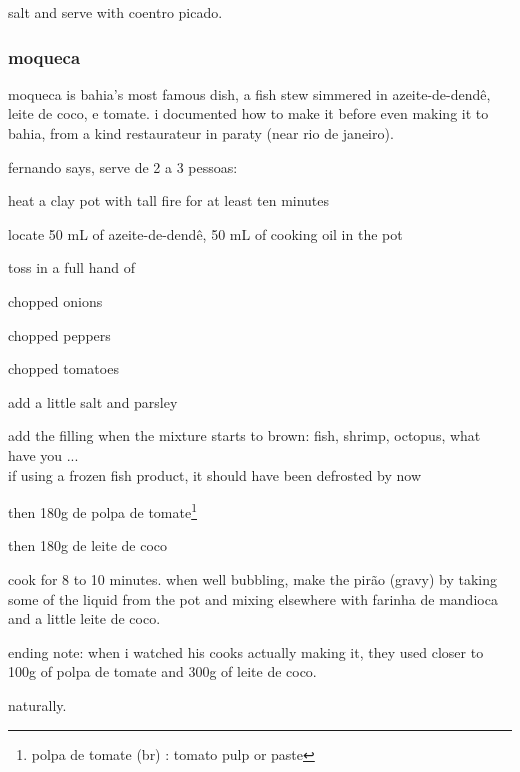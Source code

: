 salt and serve with coentro picado.

\subsubsection{moqueca}

moqueca is bahia's most famous dish, a fish stew simmered in
azeite-de-dend\^{e}, leite de coco, e tomate. i documented how to make
it before even making it to bahia, from a kind restaurateur in paraty
(near rio de janeiro).

fernando says, serve de 2 a 3 pessoas:

\begin{algorithm}
  \item heat a clay pot with tall fire for at least ten minutes

  \item locate 50 mL of azeite-de-dend\^{e}, 50 mL of cooking oil in
  the pot

  \item toss in a full hand of

  \begin{ingredients}
    \item chopped onions
    \item chopped peppers
    \item chopped tomatoes
  \end{ingredients}

  \item add a little salt and parsley

  \item add the filling when the mixture starts to brown: fish,
  shrimp, octopus, what have you ... \\if using a frozen fish product,
  it should have been defrosted by now

  \item then 180g de polpa de tomate\footnote{polpa de tomate (br) :
  tomato pulp or paste}

  \item then 180g de leite de coco
\end{algorithm}

cook for 8 to 10 minutes. when well bubbling, make the pir\~{a}o
(gravy) by taking some of the liquid from the pot and mixing elsewhere
with farinha de mandioca and a little leite de coco.

ending note: when i watched his cooks actually making it, they used
closer to 100g of polpa de tomate and 300g of leite de coco.

\bigskip

naturally.

